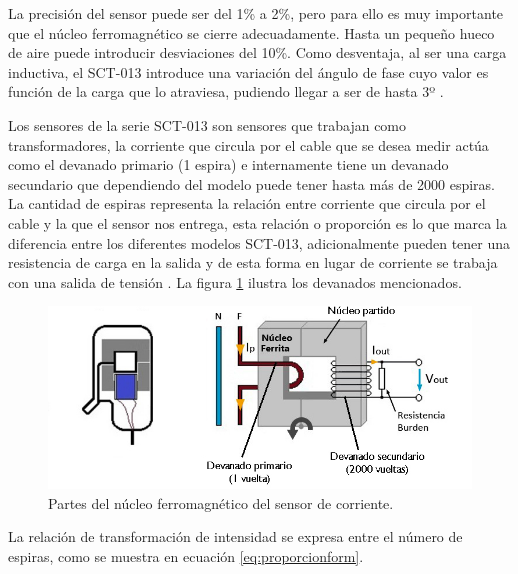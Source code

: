 La precisión del sensor puede ser del 1\% a 2\%, pero para ello es muy importante que el núcleo ferromagnético se cierre adecuadamente. Hasta un pequeño hueco de aire puede introducir desviaciones del 10\%. Como desventaja, al ser una carga inductiva, el SCT-013 introduce una variación del ángulo de fase cuyo valor es función de la carga que lo atraviesa, pudiendo llegar a ser de hasta 3º \citep{WEBSITE:9}.


Los sensores de la serie SCT-013 son sensores que trabajan como transformadores, la corriente que circula por el cable que se desea medir actúa como el devanado primario (1 espira) e internamente tiene un devanado secundario que dependiendo del modelo puede tener hasta más de 2000 espiras. La cantidad de espiras representa la relación entre corriente que circula por el cable y la que el sensor nos entrega, esta relación o proporción es lo que marca la diferencia entre los diferentes modelos SCT-013, adicionalmente pueden tener una resistencia de carga en la salida y de esta forma en lugar de corriente se trabaja con una salida de tensión \citep{WEBSITE:21}. La figura \ref{fig:espiras} ilustra los devanados mencionados.


\begin{figure}[htpb]
\centering 
\includegraphics[width=1.0\textwidth]{./Figures/espiras.jpg}
\caption{Partes del núcleo ferromagnético del sensor de corriente.}
\label{fig:espiras}
\end{figure}

La relación de transformación de intensidad se expresa entre el número de espiras, como se muestra en ecuación \ref{eq:proporcionform}.

